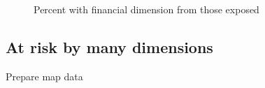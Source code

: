 \documentclass[
  letterpaper,
  DIV=11,
  numbers=noendperiod]{scrartcl}
\begin{document}
\begin{figure}[H]


\caption{\label{fig-financial}Percent with financial dimension from
those exposed}

\end{figure}%

\subsection{At risk by many
dimensions}\label{at-risk-by-many-dimensions}

Prepare map data
\end{document}
